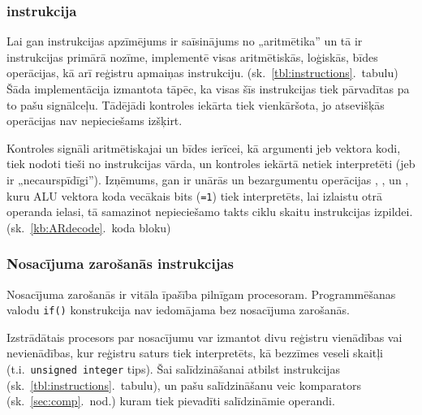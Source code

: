 \subsubsection{ instrukcija} \label{sec:AR}
	Lai gan  instrukcijas apzīmējums ir saīsinājums no „aritmētika”
	un tā ir instrukcijas primārā nozīme,  implementē visas
	aritmētiskās, loģiskās, bīdes operācijas, kā arī reģistru 
	apmaiņas  instrukciju. (sk.~\ref{tbl:instructions}.~tabulu)
	Šāda implementācija izmantota tāpēc, ka visas šīs instrukcijas tiek
	pārvadītas pa to pašu signālceļu. Tādējādi kontroles iekārta tiek
	vienkāršota, jo atsevišķās operācijas nav nepieciešams izšķirt.
	
	Kontroles signāli aritmētiskajai un bīdes ierīcei,
	kā argumenti jeb vektora kodi,
	tiek nodoti tieši no instrukcijas vārda, un kontroles iekārtā netiek
	interpretēti (jeb ir „necaurspīdīgi”). Izņēmums, gan ir 
	unārās un bezargumentu operācijas
	, ,  un , kuru ALU
	vektora koda vecākais bits (\texttt{=1}) tiek interpretēts, lai izlaistu
	otrā operanda ielasi, tā samazinot nepieciešamo takts ciklu skaitu
	instrukcijas izpildei. (sk.~\ref{kb:ARdecode}.~koda bloku)
	
	\begin{singlespace}
		VHDL},%
		                caption={\mnem{AR} instrukcijas dekodēšana. (\texttt{control2.vhd})},%
		                label=kb:ARdecode,%
		                firstnumber=150]
			{code/gen/ardecode-snippet.vhd}
	\end{singlespace}


\subsubsection{Nosacījuma zarošanās instrukcijas} \label{sec:branching}
	Nosacījuma zarošanās ir vitāla īpašība pilnīgam procesoram. Programmēšanas
	valodu \texttt{if()} konstrukcija nav iedomājama bez
	nosacījuma zarošanās.
	
	Izstrādātais procesors par nosacījumu var izmantot divu reģistru
	vienā\-dības vai nevienādības, kur reģistru saturs tiek interpretēts, kā
	bezzīmes veseli skaitļi (t.i.~\texttt{unsigned~integer} tips).
	Šai salīdzināšanai atbilst  instrukcijas
	(sk.~\ref{tbl:instructions}.~tabulu), un pašu salīdzināšanu veic komparators
	(sk.~\ref{sec:comp}.~nod.) kuram tiek pievadīti salīdzināmie operandi.
	
